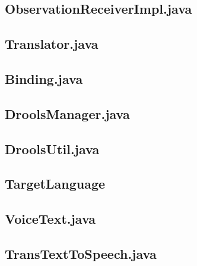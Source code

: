 \documentclass{kuisthesis}			%
\begin{document}
\subsection{ObservationReceiverImpl.java}


\subsection{Translator.java}


\subsection{Binding.java}


\subsection{DroolsManager.java}


\subsection{DroolsUtil.java}


\subsection{TargetLanguage}


\subsection{VoiceText.java}


\subsection{TransTextToSpeech.java}

\end{document}
